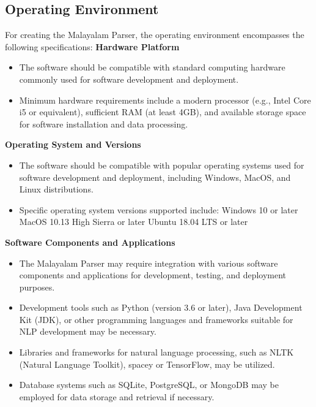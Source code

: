\documentclass[12pt,a4paper,titlepage]{report}
\begin{document}
	\subsection{Operating Environment}
	For creating the Malayalam Parser, the operating environment encompasses the following specifications:
	\newline
	\textbf{Hardware Platform}
	\begin{itemize}
		\item The software should be compatible with standard computing hardware commonly used for
		software development and deployment.
		\item Minimum hardware requirements include a modern processor (e.g., Intel Core i5 or equivalent),
		sufficient RAM (at least 4GB), and available storage space for software installation and data
		processing.
	\end{itemize}
	\textbf{Operating System and Versions}
	\begin{itemize}
		\item The software should be compatible with popular operating systems used for software development
		and deployment, including Windows, MacOS, and Linux distributions.
		\item Specific operating system versions supported include:
		\newline
		Windows 10 or later
		\newline
		MacOS 10.13 High Sierra or later
		\newline
		Ubuntu 18.04 LTS or later
	\end{itemize}
	\textbf{Software Components and Applications}
	\begin{itemize}
		\item The Malayalam Parser may require integration with various software components and applications
		for development, testing, and deployment purposes.
		\item Development tools such as Python (version 3.6 or later), Java Development Kit (JDK),
		or other programming languages and frameworks suitable for NLP development may be
		necessary.
		\item Libraries and frameworks for natural language processing, such as NLTK (Natural Language
		Toolkit), spacey or TensorFlow, may be utilized.
		\item Database systems such as SQLite, PostgreSQL, or MongoDB may be employed for data
		storage and retrieval if necessary.
	\end{itemize}
	
\end{document}
